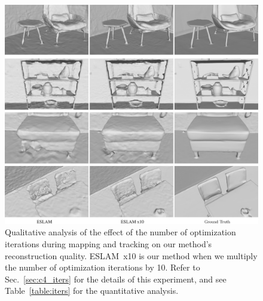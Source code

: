 \begin{figure}[t]
    \begin{center}
        \includegraphics[width=1.0\linewidth]{images/chapter4/figures/iters.jpg}
    \end{center}
    \caption{Qualitative analysis of the effect of the number of optimization iterations during mapping and tracking on our method's reconstruction quality. ESLAM~x10 is our method when we multiply the number of optimization iterations by 10. Refer to Sec.~\ref{sec:c4_iters} for the details of this experiment, and see Table~\ref{table:iters} for the quantitative analysis.}
    \label{fig:c4_iters}
\end{figure}

